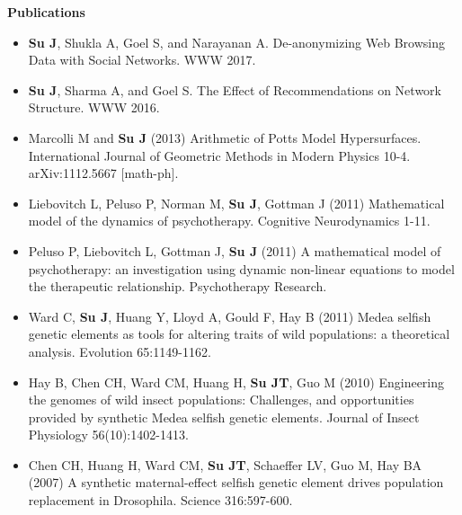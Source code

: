 \documentclass[letterpaper,10pt]{article}
\newcommand{\resheading}[1]{{\large \colorbox{mygrey}{\begin{minipage}{\textwidth}{\textbf{#1 \vphantom{p\^{E}}}}\end{minipage}}}}
\begin{document}
\resheading{Publications}
\begin{itemize}
\item \textbf{Su J}, Shukla A, Goel S, and Narayanan A.  De-anonymizing Web Browsing Data with Social Networks.  WWW 2017.
  \item \textbf{Su J}, Sharma A, and Goel S.  The Effect of Recommendations on Network Structure.  WWW 2016.
	\item Marcolli M and \textbf{Su J} (2013) Arithmetic of Potts Model Hypersurfaces.  International Journal of Geometric Methods in Modern Physics 10-4.  arXiv:1112.5667 [math-ph].
	\item Liebovitch L, Peluso P, Norman M, \textbf{Su J}, Gottman J (2011) Mathematical model of the dynamics of psychotherapy.  Cognitive Neurodynamics 1-11.
	\item Peluso P, Liebovitch L, Gottman J, \textbf{Su J} (2011) A mathematical model of psychotherapy: an investigation using dynamic non-linear equations to model the therapeutic relationship.  Psychotherapy Research.
	\item Ward C, \textbf{Su J}, Huang Y, Lloyd A, Gould F, Hay B (2011) Medea selfish genetic elements as tools for altering traits of wild populations: a theoretical analysis.  Evolution 65:1149-1162.
	\item Hay B, Chen CH, Ward CM, Huang H, \textbf{Su JT}, Guo M (2010) Engineering the genomes of wild insect populations: Challenges, and opportunities provided by synthetic Medea selfish genetic elements.  Journal of Insect Physiology 56(10):1402-1413.
	\item Chen CH, Huang H, Ward CM, \textbf{Su JT}, Schaeffer LV, Guo M, Hay BA (2007) A synthetic maternal-effect selfish genetic element drives population replacement in Drosophila. Science 316:597-600.
\end{itemize}
\end{document}
